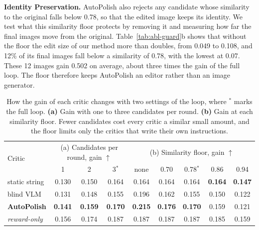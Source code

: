 \documentclass[runningheads]{llncs}
\begin{document}
\textbf{Identity Preservation.} AutoPolish also rejects any candidate whose similarity to the original falls below 0.78, so that the edited image keeps its identity. We test what this similarity floor protects by removing it and measuring how far the final images move from the original. Table~\ref{tab:abl-guard}b shows that without the floor the edit size of our method more than doubles, from 0.049 to 0.108, and 12\% of its final images fall below a similarity of 0.78, with the lowest at 0.07. These 12 images gain 0.502 on average, about three times the gain of the full loop. The floor therefore keeps AutoPolish an editor rather than an image generator.

\begin{table}[t]
  \caption{How the gain of each critic changes with two settings of the loop, where $^\ast$ marks the full loop. \textbf{(a)} Gain with one to three candidates per round. \textbf{(b)} Gain at each similarity floor. Fewer candidates cost every critic a similar small amount, and the floor limits only the critics that write their own instructions.}
  \label{tab:abl-setting}
  \centering
  \fontsize{7.5}{9}\selectfont
  \setlength{\aboverulesep}{0pt}\setlength{\belowrulesep}{0pt}
  \renewcommand{\arraystretch}{1.1}
  \setlength{\tabcolsep}{2.4pt}
  \begin{tabular*}{\linewidth}{@{\extracolsep{\fill}}l|ccc|ccccc@{}}
    \toprule
    \multirow{2}{*}{Critic} & \multicolumn{3}{c|}{(a) Candidates per round, gain $\uparrow$\rule{0pt}{2.4ex}} & \multicolumn{5}{c}{(b) Similarity floor, gain $\uparrow$} \\
    \rule[-0.8ex]{0pt}{0pt} & 1 & 2 & 3$^\ast$ & none & 0.70 & 0.78$^\ast$ & 0.86 & 0.94 \\
    \midrule
    static string\rule{0pt}{2.3ex} & 0.130 & 0.150 & 0.164 & 0.164 & 0.164 & 0.164 & \textbf{0.164} & \textbf{0.147} \\
    blind VLM & 0.131 & 0.148 & 0.155 & 0.196 & 0.162 & 0.155 & 0.150 & 0.122 \\
    \textbf{AutoPolish}\rule[-0.7ex]{0pt}{0pt} & \textbf{0.141} & \textbf{0.159} & \textbf{0.170} & \textbf{0.215} & \textbf{0.176} & \textbf{0.170} & 0.159 & 0.121 \\
    \midrule
    \textit{reward-only}\rule{0pt}{2.3ex}\rule[-0.7ex]{0pt}{0pt} & 0.156 & 0.174 & 0.187 & 0.187 & 0.187 & 0.187 & 0.185 & 0.159 \\
    \bottomrule
  \end{tabular*}
\end{table}
\end{document}
